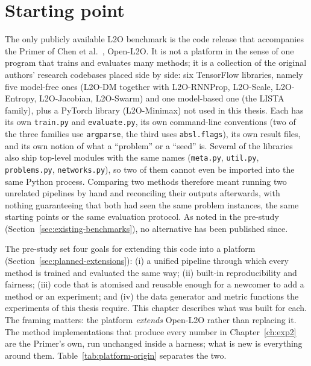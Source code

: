 \section{Starting point}
\label{sec:platform-start}

The only publicly available L2O benchmark is the code release that accompanies
the Primer of Chen et al.~\cite{chen2021primer}, Open-L2O. It is not a
platform in the sense of one program that trains and evaluates many methods;
it is a collection of the original authors' research codebases placed side by
side: six TensorFlow libraries, namely five model-free ones (L2O-DM together
with L2O-RNNProp, L2O-Scale, L2O-Entropy, L2O-Jacobian, L2O-Swarm) and one
model-based one (the LISTA family), plus a PyTorch library (L2O-Minimax) not
used in this thesis. Each has its own \texttt{train.py} and \texttt{evaluate.py}, its own
command-line conventions (two of the three families use \texttt{argparse}, the
third uses \texttt{absl.flags}), its own result files, and its own notion of
what a ``problem'' or a ``seed'' is. Several of the libraries also ship
top-level modules with the same names (\texttt{meta.py}, \texttt{util.py},
\texttt{problems.py}, \texttt{networks.py}), so two of them cannot even be
imported into the same Python process. Comparing two methods therefore meant
running two unrelated pipelines by hand and reconciling their outputs
afterwards, with nothing guaranteeing that both had seen the same problem
instances, the same starting points or the same evaluation protocol. As noted
in the pre-study (Section~\ref{sec:existing-benchmarks}), no alternative has
been published since.

The pre-study set four goals for extending this code into a platform
(Section~\ref{sec:planned-extensions}): (i) a unified pipeline through which
every method is trained and evaluated the same way; (ii) built-in
reproducibility and fairness; (iii) code that is atomised and reusable enough
for a newcomer to add a method or an experiment; and (iv) the data generator
and metric functions the experiments of this thesis require. This chapter
describes what was built for each. The framing matters: the platform
\emph{extends} Open-L2O rather than replacing it. The method implementations
that produce every number in Chapter~\ref{ch:exp2} are the Primer's own, run
unchanged inside a harness; what is new is everything around them.
Table~\ref{tab:platform-origin} separates the two.


